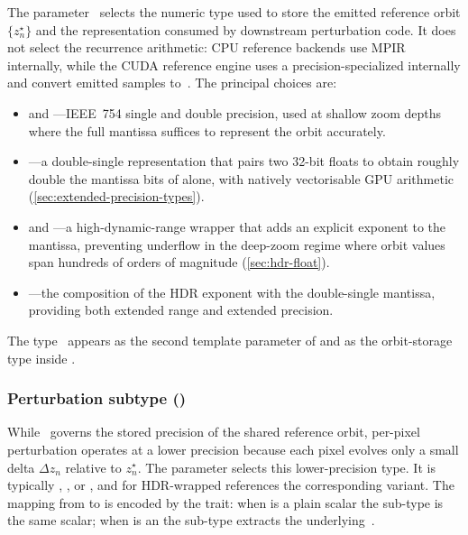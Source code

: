The parameter~ selects the numeric type used to store the emitted
reference orbit $\{z_n^\star\}$ and the representation consumed by downstream
perturbation code.  It does not select the recurrence arithmetic: CPU reference
backends use MPIR internally, while the CUDA reference engine uses a
precision-specialized  internally and convert emitted samples
to~.
The principal choices are:

\begin{itemize}
  \item {} and ---IEEE~754 single and double
        precision, used at shallow zoom depths where the full mantissa
        suffices to represent the orbit accurately.
  \item {}---a double-single representation
        that pairs two 32-bit floats to obtain roughly double the
        mantissa bits of  alone, with natively vectorisable
        GPU arithmetic (\cref{sec:extended-precision-types}).
  \item {} and ---a
        high-dynamic-range wrapper that adds an explicit exponent to the
        mantissa, preventing underflow in the deep-zoom regime where
        orbit values span hundreds of orders of magnitude
        (\cref{sec:hdr-float}).
  \item {}---the composition of
        the HDR exponent with the double-single mantissa, providing
        both extended range and extended precision.
\end{itemize}

\noindent
The type~ appears as the second template parameter of
and as the orbit-storage type inside .


\subsubsection{Perturbation subtype ()}
\label{subsec:template-subtype}

While~ governs the stored precision of the shared reference orbit,
per-pixel perturbation operates at a lower precision because each
pixel evolves only a small delta $\Delta z_n$ relative to $z_n^\star$.
The  parameter selects this lower-precision type.  It
is typically , , or
, and for HDR-wrapped references the
corresponding  variant.  The mapping from  to
 is encoded by the  trait: when
 is a plain scalar the sub-type is the same scalar; when
 is an  the sub-type extracts the
underlying~.

